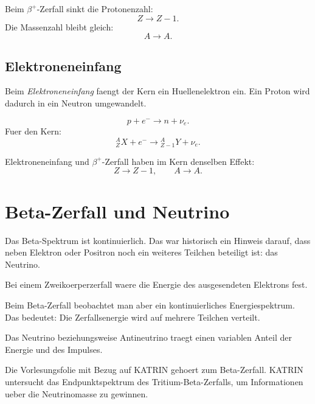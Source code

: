 \begin{conceptbox}
Beim $\beta^+$-Zerfall sinkt die Protonenzahl:
\[
    Z \rightarrow Z-1.
\]
Die Massenzahl bleibt gleich:
\[
    A \rightarrow A.
\]
\end{conceptbox}

\subsection{Elektroneneinfang}

\begin{definitionbox}
Beim \emph{Elektroneneinfang} faengt der Kern ein Huellenelektron ein.
Ein Proton wird dadurch in ein Neutron umgewandelt.
\end{definitionbox}

\begin{formulabox}
\[
    p + e^- \rightarrow n + \nu_e.
\]
Fuer den Kern:
\[
    {}^{A}_{Z}X + e^-
    \rightarrow
    {}^{A}_{Z-1}Y + \nu_e.
\]
\end{formulabox}

\begin{conceptbox}
Elektroneneinfang und $\beta^+$-Zerfall haben im Kern denselben Effekt:
\[
    Z \rightarrow Z-1,
    \qquad
    A \rightarrow A.
\]
\end{conceptbox}

\section{Beta-Zerfall und Neutrino}

Das Beta-Spektrum ist kontinuierlich.
Das war historisch ein Hinweis darauf, dass neben Elektron oder Positron noch ein
weiteres Teilchen beteiligt ist: das Neutrino.

\begin{conceptbox}
Bei einem Zweikoerperzerfall waere die Energie des ausgesendeten Elektrons fest.

Beim Beta-Zerfall beobachtet man aber ein kontinuierliches Energiespektrum.
Das bedeutet:
Die Zerfallsenergie wird auf mehrere Teilchen verteilt.

Das Neutrino beziehungsweise Antineutrino traegt einen variablen Anteil der Energie
und des Impulses.
\end{conceptbox}

\begin{notebox}
Die Vorlesungsfolie mit Bezug auf KATRIN gehoert zum Beta-Zerfall.
KATRIN untersucht das Endpunktspektrum des Tritium-Beta-Zerfalls, um Informationen
ueber die Neutrinomasse zu gewinnen.
\end{notebox}

